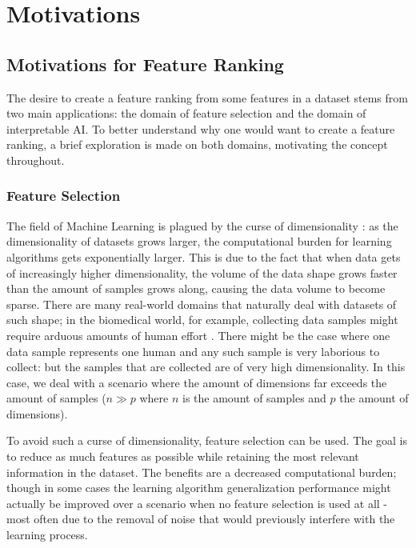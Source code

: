 \documentclass{article}
\begin{document}
\section{Motivations}


\subsection{Motivations for Feature Ranking}\label{section:motivations}
The desire to create a feature ranking from some features in a dataset stems from two main applications: the domain of feature selection and the domain of interpretable AI. To better understand why one would want to create a feature ranking, a brief exploration is made on both domains, motivating the concept throughout.

\subsubsection{Feature Selection}
The field of Machine Learning is plagued by the curse of dimensionality \citep{koppen_curse_2009}: as the dimensionality of datasets grows larger, the computational burden for learning algorithms gets exponentially larger. This is due to the fact that when data gets of increasingly higher dimensionality, the volume of the data shape grows faster than the amount of samples grows along, causing the data volume to become sparse.
There are many real-world domains that naturally deal with datasets of such shape; in the biomedical world, for example, collecting data samples might require arduous amounts of human effort \citep{hu_feature_2018}. There might be the case where one data sample represents one human and any such sample is very laborious to collect: but the samples that are collected are of very high dimensionality. In this case, we deal with a scenario where the amount of dimensions far exceeds the amount of samples ($n \gg p$ where $n$ is the amount of samples and $p$ the amount of dimensions).

To avoid such a curse of dimensionality, feature selection can be used. The goal is to reduce as much features as possible while retaining the most relevant information in the dataset. The benefits are a decreased computational burden; though in some cases the learning algorithm generalization performance might actually be improved over a scenario when no feature selection is used at all - most often due to the removal of noise that would previously interfere with the learning process.
\end{document}
